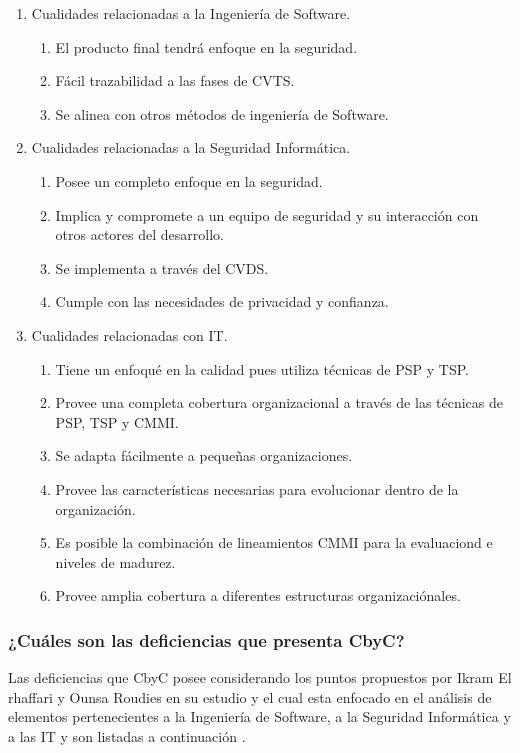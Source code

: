 \documentclass[runningheads,a4paper]{llncs}
\begin{document}
\begin{enumerate}
	\item Cualidades relacionadas a la Ingeniería de \gls{Software}.
		\begin{enumerate}
			\item El producto final tendrá enfoque en la seguridad.
			\item Fácil trazabilidad a las fases de \gls{CVTS}.
			\item Se alinea con otros métodos de ingeniería de \gls{Software}.\\
			
		\end{enumerate}
	\item Cualidades relacionadas a la Seguridad Informática.
		\begin{enumerate}
			\item Posee un completo enfoque en la seguridad.
			\item Implica y compromete a un equipo de seguridad y su interacción con otros actores del desarrollo.
			\item Se implementa a través del \gls{CVDS}.
			\item Cumple con las necesidades de privacidad y confianza.\\

		\end{enumerate}
	\item Cualidades relacionadas con \gls{IT}.
		\begin{enumerate}
			\item Tiene un enfoqué en la calidad pues utiliza técnicas de \gls{PSP} y \gls{TSP}. 
			\item Provee una completa cobertura organizacional a través de las técnicas de \gls{PSP}, \gls{TSP} y \gls{CMMI}.
			\item Se adapta fácilmente a pequeñas organizaciones.
			\item Provee las características necesarias para evolucionar dentro de la organización.
			\item Es posible la combinación de lineamientos \gls{CMMI} para la evaluaciond e niveles de madurez.
			\item Provee amplia cobertura a diferentes estructuras organizaciónales.
		\end{enumerate}
\end{enumerate}
     
\subsubsection{¿Cuáles son las deficiencias que presenta \gls{CbyC}?}
Las deficiencias que \gls{CbyC} posee considerando los puntos propuestos por Ikram El rhaffari y Ounsa Roudies en su estudio y el cual esta enfocado en el análisis de elementos pertenecientes a la Ingeniería de \gls{Software}, a la Seguridad Informática y a las \gls{IT} y son listadas a continuación \cite{BenchmarkingSDLCLAPS}.
\end{document}
